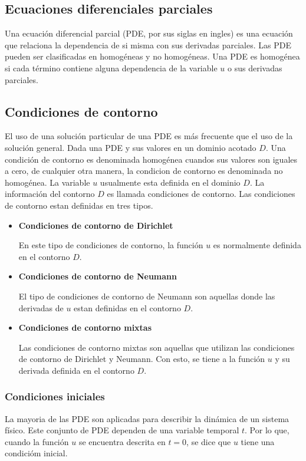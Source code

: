 \subsection{Ecuaciones diferenciales parciales}

Una ecuación diferencial parcial (PDE, por sus siglas en ingles) es una ecuación que relaciona la dependencia de si misma con sus derivadas parciales\cite{sommerfeld_1949}. Las PDE pueden ser clasificadas en homogéneas y no homogéneas. Una PDE es homogénea si cada término contiene alguna dependencia de la variable $u$ o sus derivadas parciales.

\subsection{Condiciones de contorno}

El uso de una solución particular de una PDE es más frecuente que el uso de la solución general. Dada una PDE y sus valores en un dominio acotado $D$\cite{wazwaz_2002}. Una condición de contorno es denominada homogénea cuandos sus valores son iguales a cero, de cualquier otra manera, la condicion de contorno es denominada no homogénea. La variable $u$ usualmente esta definida en el dominio $D$. La información del contorno $D$ es llamada condiciones de contorno. Las condiciones de contorno estan definidas en tres tipos.

\begin{itemize}
    \item \textbf{Condiciones de contorno de Dirichlet}

          En este tipo de condiciones de contorno, la función $u$ es normalmente definida en el contorno $D$.
    \item \textbf{Condiciones de contorno de Neumann}

          El tipo de condiciones de contorno de Neumann son aquellas donde las derivadas de $u$ estan definidas en el contorno $D$.
    \item \textbf{Condiciones de contorno mixtas}

          Las condiciones de contorno mixtas son aquellas que utilizan las condiciones de contorno de Dirichlet y Neumann. Con esto, se tiene a la función $u$ y su derivada definida en el contorno $D$.
\end{itemize}

\subsubsection{Condiciones iniciales}

La mayoria de las PDE son aplicadas para describir la dinámica de un sistema físico. Este conjunto de PDE dependen de una variable temporal $t$. Por lo que, cuando la función $u$ se encuentra descrita en $t=0$, se dice que $u$ tiene una condicióm inicial.